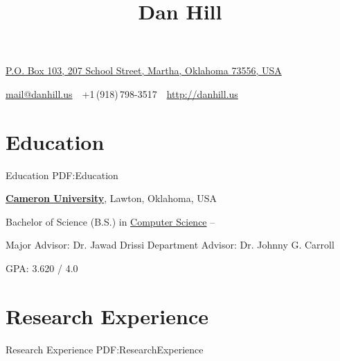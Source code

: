 \documentclass[letterpaper,10pt,oneside]{article}
\begin{document}

\title{Dan Hill}

\begin{subtitle}
\href{https://maps.google.com/maps?q=1+North+Avenue,+Apt+42,+Springfield,+Pennsylvania+12345,+USA}
{P.O. Box 103, 207 School Street, Martha, Oklahoma 73556, USA}
\par
\href{mailto:mail@danhill.us}
{mail@danhill.us}
\,\BulletSymbol\,
+1\,(918)\,798-3517
\,\BulletSymbol\,
\href{http://danhill.us}
{http://danhill.us}
\end{subtitle}

\begin{body}


\section
{Education}
{Education}
{PDF:Education}

\href{http://cameron.edu}
{\textbf{Cameron University}},
Lawton, Oklahoma, USA

\SmallEntryGap
Bachelor of Science (B.S.) in
\href{http://www.cameron.edu/comptech}
{Computer Science}
\hfill
{} --
\begin{detail}
\BulletItem
Major Advisor: Dr. Jawad Drissi
\BulletItem
Department Advisor: Dr. Johnny G. Carroll
\end{detail}


\begin{detail}
\BulletItem
GPA: 3.620 / 4.0
\end{detail}




\section
{Research Experience}
{Research Experience}
{PDF:ResearchExperience}


\end{body}
\end{document}
